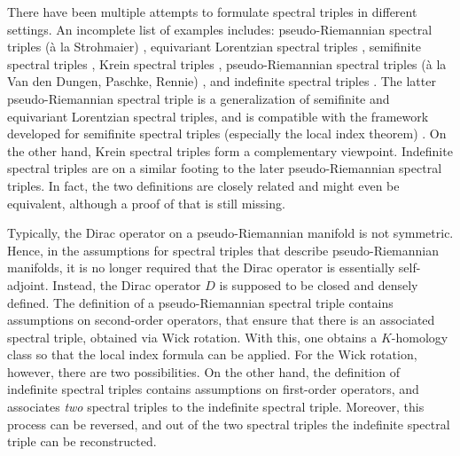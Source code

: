 \documentclass{amsart}
\theoremstyle{definition}
\theoremstyle{remark}
\numberwithin{equation}{section}
\begin{document}
There have been multiple attempts to formulate spectral triples in different settings. An incomplete list of examples includes: pseudo-Riemannian spectral triples (à la Strohmaier) \cite{strohmaier_2006}, equivariant Lorentzian spectral triples \cite{paschke_sitarz_2006}, semifinite spectral triples \cite{carey_gayral_rennie_sukochev_2014}, Krein spectral triples \cite{dungen_2016}, pseudo-Riemannian spectral triples (à la Van den Dungen, Paschke, Rennie) \cite{dungen_paschke_rennie_2013}, and indefinite spectral triples \cite{dungen_rennie_2016, dungen_2019}. The latter pseudo-Riemannian spectral triple is a generalization of semifinite and equivariant Lorentzian spectral triples, and is compatible with the framework developed for semifinite spectral triples (especially the local index theorem) \cite{dungen_paschke_rennie_2013}. On the other hand, Krein spectral triples form a complementary viewpoint. Indefinite spectral triples are on a similar footing to the later pseudo-Riemannian spectral triples. In fact, the two definitions are closely related and might even be equivalent, although a proof of that is still missing.

Typically, the Dirac operator on a pseudo-Riemannian manifold is not symmetric. Hence, in the assumptions for spectral triples that describe pseudo-Riemannian manifolds, it is no longer required that the Dirac operator is essentially self-adjoint. Instead, the Dirac operator $D$ is supposed to be closed and densely defined. The definition of a pseudo-Riemannian spectral triple \cite{dungen_paschke_rennie_2013} contains assumptions on second-order operators, that ensure that there is an associated spectral triple, obtained via Wick rotation. With this, one obtains a $K$-homology class so that the local index formula can be applied. For the Wick rotation, however, there are two possibilities. On the other hand, the definition of indefinite spectral triples \cite{dungen_rennie_2016,dungen_2019} contains assumptions on first-order operators, and associates \emph{two} spectral triples to the indefinite spectral triple. Moreover, this process can be reversed, and out of the two spectral triples the indefinite spectral triple can be reconstructed.
\end{document}
